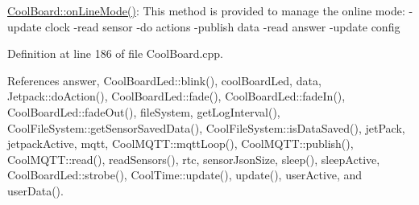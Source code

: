 \hyperlink{classCoolBoard_aa0bbc4bc605e35618d18e68795c61363}{Cool\+Board\+::on\+Line\+Mode()}\+: This method is provided to manage the online mode\+: -\/update clock -\/read sensor -\/do actions -\/publish data -\/read answer -\/update config 

Definition at line 186 of file Cool\+Board.\+cpp.



References answer, Cool\+Board\+Led\+::blink(), cool\+Board\+Led, data, Jetpack\+::do\+Action(), Cool\+Board\+Led\+::fade(), Cool\+Board\+Led\+::fade\+In(), Cool\+Board\+Led\+::fade\+Out(), file\+System, get\+Log\+Interval(), Cool\+File\+System\+::get\+Sensor\+Saved\+Data(), Cool\+File\+System\+::is\+Data\+Saved(), jet\+Pack, jetpack\+Active, mqtt, Cool\+M\+Q\+T\+T\+::mqtt\+Loop(), Cool\+M\+Q\+T\+T\+::publish(), Cool\+M\+Q\+T\+T\+::read(), read\+Sensors(), rtc, sensor\+Json\+Size, sleep(), sleep\+Active, Cool\+Board\+Led\+::strobe(), Cool\+Time\+::update(), update(), user\+Active, and user\+Data().



